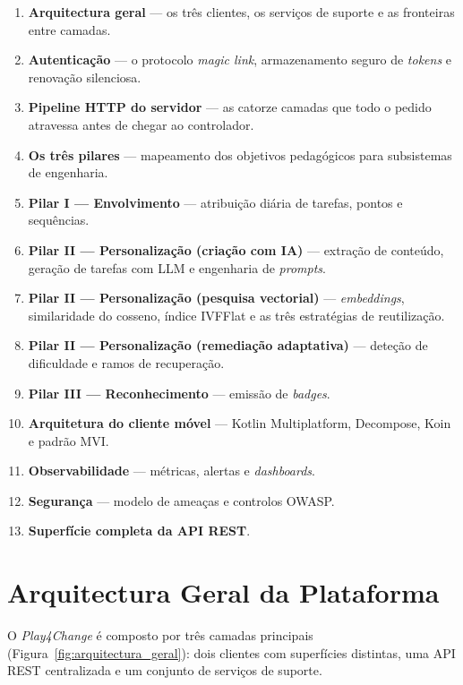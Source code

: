 \begin{enumerate}
  \item \textbf{Arquitectura geral} — os três clientes, os serviços de
    suporte e as fronteiras entre camadas.
  \item \textbf{Autenticação} — o protocolo \textit{magic link},
    armazenamento seguro de \textit{tokens} e renovação silenciosa.
  \item \textbf{Pipeline HTTP do servidor} — as catorze camadas que todo
    o pedido atravessa antes de chegar ao controlador.
  \item \textbf{Os três pilares} — mapeamento dos objetivos pedagógicos
    para subsistemas de engenharia.
  \item \textbf{Pilar I — Envolvimento} — atribuição diária de tarefas,
    pontos e sequências.
  \item \textbf{Pilar II — Personalização (criação com IA)} — extração
    de conteúdo, geração de tarefas com LLM e engenharia de
    \textit{prompts}.
  \item \textbf{Pilar II — Personalização (pesquisa vectorial)} —
    \textit{embeddings}, similaridade do cosseno, índice IVFFlat e as
    três estratégias de reutilização.
  \item \textbf{Pilar II — Personalização (remediação adaptativa)} —
    deteção de dificuldade e ramos de recuperação.
  \item \textbf{Pilar III — Reconhecimento} — emissão de \textit{badges}.
  \item \textbf{Arquitetura do cliente móvel} — Kotlin Multiplatform,
    Decompose, Koin e padrão MVI.
  \item \textbf{Observabilidade} — métricas, alertas e \textit{dashboards}.
  \item \textbf{Segurança} — modelo de ameaças e controlos OWASP.
  \item \textbf{Superfície completa da API REST}.
\end{enumerate}

\section{Arquitectura Geral da Plataforma}
\label{sec:arquitectura_geral}

O \textit{Play4Change} é composto por três camadas principais
(Figura~\ref{fig:arquitectura_geral}): dois clientes com superfícies
distintas, uma API REST centralizada e um conjunto de serviços de suporte.

